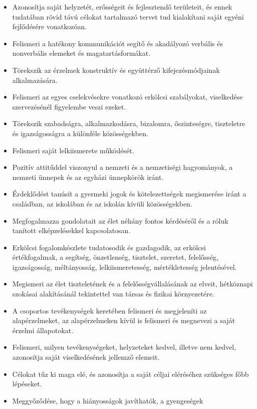 \begin{itemize}
\item
  Azonosítja saját helyzetét, erősségeit és fejlesztendő területeit, és
  ennek tudatában rövid távú célokat tartalmazó tervet tud kialakítani
  saját egyéni fejlődésére vonatkozóan.
\item
  Felismeri a hatékony kommunikációt segítő és akadályozó verbális és
  nonverbális elemeket és magatartásformákat.
\item
  Törekszik az érzelmek konstruktív és együttérző kifejezésmódjainak
  alkalmazására.
\item
  Felismeri az egyes cselekvésekre vonatkozó erkölcsi szabályokat,
  viselkedése szervezésénél figyelembe veszi ezeket.
\item
  Törekszik szabadságra, alkalmazkodásra, bizalomra, őszinteségre,
  tiszteletre és igazságosságra a különféle közösségekben.
\item
  Felismeri saját lelkiismerete működését.
\item
  Pozitív attitűddel viszonyul a nemzeti és a nemzetiségi hagyományok, a
  nemzeti ünnepek és az egyházi ünnepkörök iránt.
\item
  Érdeklődést tanúsít a gyermeki jogok és kötelezettségek megismerése
  iránt a családban, az iskolában és az iskolán kívüli közösségekben.
\item
  Megfogalmazza gondolatait az élet néhány fontos kérdéséről és a róluk
  tanított elképzelésekkel kapcsolatosan.
\item
  Erkölcsi fogalomkészlete tudatosodik és gazdagodik, az erkölcsi
  értékfogalmak, a segítség, önzetlenség, tisztelet, szeretet,
  felelősség, igazságosság, méltányosság, lelkiismeretesség,
  mértékletesség jelentésével.
\item
  Megismeri az élet tiszteletének és a felelősségvállalásának az elveit,
  hétköznapi szokásai alakításánál tekintettel van társas és fizikai
  környezetére.
\item
  A csoportos tevékenységek keretében felismeri és megjeleníti az
  alapérzelmeket, az alapérzelmeken kívül is felismeri és megnevezi a
  saját érzelmi állapotokat.
\item
  Felismeri, milyen tevékenységeket, helyzeteket kedvel, illetve nem
  kedvel, azonosítja saját viselkedésének jellemző elemeit.
\item
  Célokat tűz ki maga elé, és azonosítja a saját céljai eléréséhez
  szükséges főbb lépéseket.
\item
  Meggyőződése, hogy a hiányosságok javíthatók, a gyengeségek

\end{itemize}
